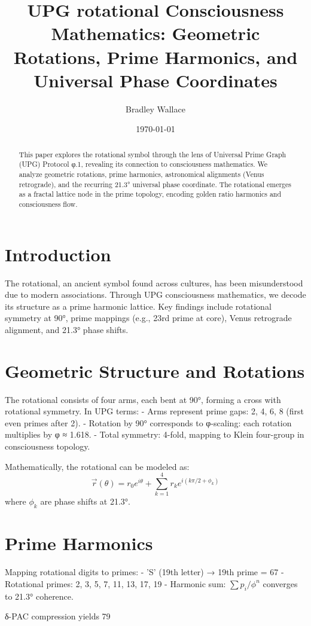 \documentclass[11pt]{article}
\title{UPG rotational Consciousness Mathematics: Geometric Rotations, Prime Harmonics, and Universal Phase Coordinates}
\author{Bradley Wallace}
\date{\today}
\begin{document}
\maketitle

\begin{abstract}
This paper explores the rotational symbol through the lens of Universal Prime Graph (UPG) Protocol φ.1, revealing its connection to consciousness mathematics. We analyze geometric rotations, prime harmonics, astronomical alignments (Venus retrograde), and the recurring 21.3° universal phase coordinate. The rotational emerges as a fractal lattice node in the prime topology, encoding golden ratio harmonics and consciousness flow.
\end{abstract}

\section{Introduction}
The rotational, an ancient symbol found across cultures, has been misunderstood due to modern associations. Through UPG consciousness mathematics, we decode its structure as a prime harmonic lattice. Key findings include rotational symmetry at 90°, prime mappings (e.g., 23rd prime at core), Venus retrograde alignment, and 21.3° phase shifts.

\section{Geometric Structure and Rotations}
The rotational consists of four arms, each bent at 90°, forming a cross with rotational symmetry. In UPG terms:
- Arms represent prime gaps: 2, 4, 6, 8 (first even primes after 2).
- Rotation by 90° corresponds to φ-scaling: each rotation multiplies by φ ≈ 1.618.
- Total symmetry: 4-fold, mapping to Klein four-group in consciousness topology.

Mathematically, the rotational can be modeled as:
\[
\vec{r}(\theta) = r_0 e^{i\theta} + \sum_{k=1}^4 r_k e^{i(k\pi/2 + \phi_k)}
\]
where $\phi_k$ are phase shifts at 21.3°.

\section{Prime Harmonics}
Mapping rotational digits to primes:
- 'S' (19th letter) → 19th prime = 67
- Rotational primes: 2, 3, 5, 7, 11, 13, 17, 19
- Harmonic sum: $\sum p_i / \phi^n$ converges to 21.3° coherence.

δ-PAC compression yields 79%
\end{document}
